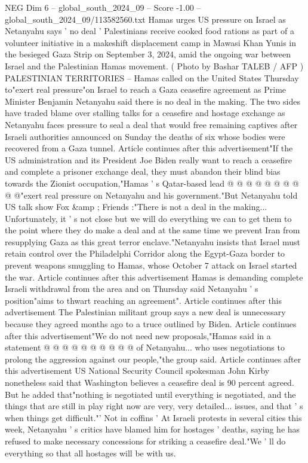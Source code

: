 \begin{textsample}{NEG Dim 6 – global\_south\_2024\_09 – Score -1.00 – global\_south\_2024\_09/113582560.txt}  \label{ex:f6_neg_011}
Hamas urges US pressure on Israel as Netanyahu says ' no deal ' Palestinians receive cooked food rations as part of a volunteer initiative in a makeshift displacement camp in Mawasi Khan Yunis in the besieged Gaza Strip on September 3, 2024, amid the ongoing war between Israel and the Palestinian Hamas movement. ( Photo by Bashar TALEB / AFP ) PALESTINIAN TERRITORIES -- Hamas called on the United States Thursday to"exert real pressure"on Israel to reach a Gaza ceasefire agreement as Prime Minister Benjamin Netanyahu said there is no deal in the making.
The two sides have traded blame over stalling talks for a ceasefire and hostage exchange as Netanyahu faces pressure to seal a deal that would free remaining captives after Israeli authorities announced on Sunday the deaths of six whose bodies were recovered from a Gaza tunnel.
Article continues after this advertisement"If the US administration and its President Joe Biden really want to reach a ceasefire and complete a prisoner exchange deal, they must abandon their blind bias towards the Zionist occupation,"Hamas ' s Qatar-based lead @ @ @ @ @ @ @ @ @ @"exert real pressure on Netanyahu and his government."But Netanyahu told US talk show Fox \&amp ; Friends :"There is not a deal in the making...
Unfortunately, it ' s not close but we will do everything we can to get them to the point where they do make a deal and at the same time we prevent Iran from resupplying Gaza as this great terror enclave."Netanyahu insists that Israel must retain control over the Philadelphi Corridor along the Egypt-Gaza border to prevent weapons smuggling to Hamas, whose October 7 attack on Israel started the war.
Article continues after this advertisement Hamas is demanding complete Israeli withdrawal from the area and on Thursday said Netanyahu ' s position"aims to thwart reaching an agreement".
Article continues after this advertisement The Palestinian militant group says a new deal is unnecessary because they agreed months ago to a truce outlined by Biden.
Article continues after this advertisement"We do not need new proposals,"Hamas said in a statement @ @ @ @ @ @ @ @ @ @ of Netanyahu... who uses negotiations to prolong the aggression against our people,"the group said.
Article continues after this advertisement US National Security Council spokesman John Kirby nonetheless said that Washington believes a ceasefire deal is 90 percent agreed.
But he added that"nothing is negotiated until everything is negotiated, and the things that are still in play right now are very, very detailed... issues, and that ' s when things get difficult."' Not in coffins ' At Israeli protests in several cities this week, Netanyahu ' s critics have blamed him for hostages ' deaths, saying he has refused to make necessary concessions for striking a ceasefire deal."We ' ll do everything so that all hostages will be with us.

\end{textsample}
